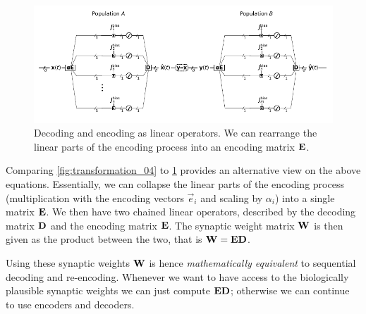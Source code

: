 \documentclass[10pt,letterpaper,oneside]{article}
\begin{document}
	\begin{figure}
		\centering
		\includegraphics[width=\textwidth]{media/transformation_06.pdf}
		\caption{Decoding and encoding as linear operators. We can rearrange the linear parts of the encoding process into an encoding matrix ${\mathbf{E}}$.}
		\label{fig:transformation_06}
	\end{figure}
	Comparing \cref{fig:transformation_04} to \cref{fig:transformation_06} provides an alternative view on the above equations. Essentially, we can collapse the linear parts of the encoding process (multiplication with the encoding vectors $\vec e_i$ and scaling by $\alpha_i$) into a single matrix ${\mathbf{E}}$. We then have two chained linear operators, described by the decoding matrix ${\mathbf{D}}$ and the encoding matrix ${\mathbf{E}}$. The synaptic weight matrix ${\mathbf{W}}$ is then given as the product between the two, that is ${\mathbf{W}} = {\mathbf{E}} {\mathbf{D}}$.
	
	Using these synaptic weights ${\mathbf{W}}$ is hence \emph{mathematically equivalent} to sequential decoding and re-encoding. Whenever we want to have access to the biologically plausible synaptic weights we can just compute ${\mathbf{E}} {\mathbf{D}}$; otherwise we can continue to use encoders and decoders.
\end{document}
